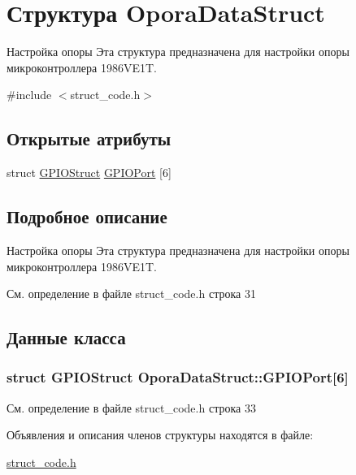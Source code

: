 \hypertarget{struct_opora_data_struct}{}\section{Структура Opora\+Data\+Struct}
\label{struct_opora_data_struct}


Настройка опоры Эта структура предназначена для настройки опоры микроконтроллера 1986\+V\+E1\+T.  




{\ttfamily \#include $<$struct\+\_\+code.\+h$>$}

\subsection*{Открытые атрибуты}
\begin{DoxyCompactItemize}
\item 
struct \hyperlink{struct_g_p_i_o_struct}{G\+P\+I\+O\+Struct} \hyperlink{struct_opora_data_struct_a390c020a4cec758af905415a634b4722}{G\+P\+I\+O\+Port} \mbox{[}6\mbox{]}
\end{DoxyCompactItemize}


\subsection{Подробное описание}
Настройка опоры Эта структура предназначена для настройки опоры микроконтроллера 1986\+V\+E1\+T. 

См. определение в файле struct\+\_\+code.\+h строка 31



\subsection{Данные класса}
\hypertarget{struct_opora_data_struct_a390c020a4cec758af905415a634b4722}{}
\subsubsection[{G\+P\+I\+O\+Port}]{\setlength{\rightskip}{0pt plus 5cm}struct {\bf G\+P\+I\+O\+Struct} Opora\+Data\+Struct\+::\+G\+P\+I\+O\+Port\mbox{[}6\mbox{]}}\label{struct_opora_data_struct_a390c020a4cec758af905415a634b4722}


См. определение в файле struct\+\_\+code.\+h строка 33



Объявления и описания членов структуры находятся в файле\+:\begin{DoxyCompactItemize}
\item 
\hyperlink{struct__code_8h}{struct\+\_\+code.\+h}\end{DoxyCompactItemize}
